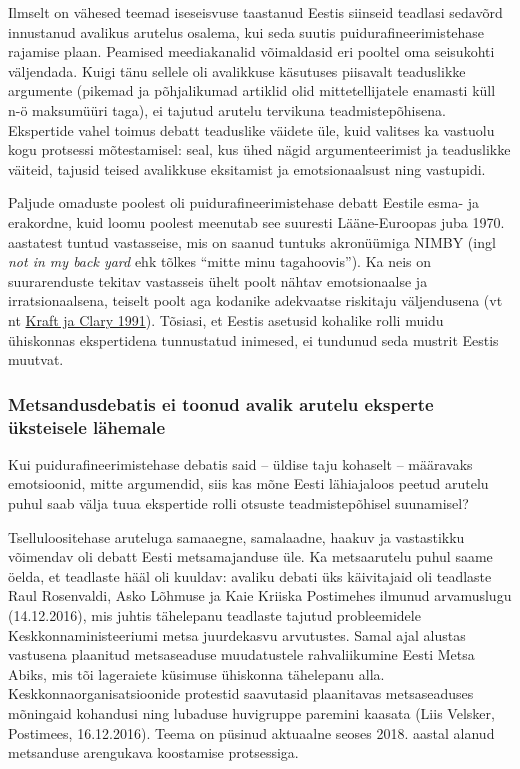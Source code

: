 \documentclass[estonian,]{article}
\begin{document}
Ilmselt on vähesed teemad iseseisvuse taastanud Eestis siinseid teadlasi sedavõrd innustanud avalikus arutelus osalema, kui seda suutis puidurafineerimistehase rajamise plaan. Peamised meediakanalid võimaldasid eri pooltel oma seisukohti väljendada. Kuigi tänu sellele oli avalikkuse käsutuses piisavalt teaduslikke argumente (pikemad ja põhjalikumad artiklid olid mittetellijatele enamasti küll n-ö maksumüüri taga), ei tajutud arutelu tervikuna teadmistepõhisena. Ekspertide vahel toimus debatt teaduslike väidete üle, kuid valitses ka vastuolu kogu protsessi mõtestamisel: seal, kus ühed nägid argumenteerimist ja teaduslikke väiteid, tajusid teised avalikkuse eksitamist ja emotsionaalsust ning vastupidi.

Paljude omaduste poolest oli puidurafineerimistehase debatt Eestile esma- ja erakordne, kuid loomu poolest meenutab see suuresti Lääne-Euroopas juba 1970. aastatest tuntud vastasseise, mis on saanud tuntuks akronüümiga NIMBY (ingl \emph{not in my back yard} ehk tõlkes ``mitte minu tagahoovis''). Ka neis on suurarenduste tekitav vastasseis ühelt poolt nähtav emotsionaalse ja irratsionaalsena, teiselt poolt aga kodanike adekvaatse riskitaju väljendusena (vt nt \protect\hyperlink{Kraft1991}{Kraft ja Clary 1991}). Tõsiasi, et Eestis asetusid kohalike rolli muidu ühiskonnas ekspertidena tunnustatud inimesed, ei tundunud seda mustrit Eestis muutvat.

\hypertarget{metsandusdebatis-ei-toonud-avalik-arutelu-eksperte-uxfcksteisele-luxe4hemale}{%
\subsubsection*{Metsandusdebatis ei toonud avalik arutelu eksperte üksteisele lähemale}\label{metsandusdebatis-ei-toonud-avalik-arutelu-eksperte-uxfcksteisele-luxe4hemale}}

Kui puidurafineerimistehase debatis said -- üldise taju kohaselt -- määravaks emotsioonid, mitte argumendid, siis kas mõne Eesti lähiajaloos peetud arutelu puhul saab välja tuua ekspertide rolli otsuste teadmistepõhisel suunamisel?

Tselluloositehase aruteluga samaaegne, samalaadne, haakuv ja vastastikku võimendav oli debatt Eesti metsamajanduse üle. Ka metsaarutelu puhul saame öelda, et teadlaste hääl oli kuuldav: avaliku debati üks käivitajaid oli teadlaste Raul Rosenvaldi, Asko Lõhmuse ja Kaie Kriiska Postimehes ilmunud arvamuslugu (14.12.2016), mis juhtis tähelepanu teadlaste tajutud probleemidele Keskkonnaministeeriumi metsa juurdekasvu arvutustes. Samal ajal alustas vastusena plaanitud metsaseaduse muudatustele rahvaliikumine Eesti Metsa Abiks, mis tõi lageraiete küsimuse ühiskonna tähelepanu alla. Keskkonnaorganisatsioonide protestid saavutasid plaanitavas metsaseaduses mõningaid kohandusi ning lubaduse huvigruppe paremini kaasata (Liis Velsker, Postimees, 16.12.2016). Teema on püsinud aktuaalne seoses 2018. aastal alanud metsanduse arengukava koostamise protsessiga.
\end{document}
